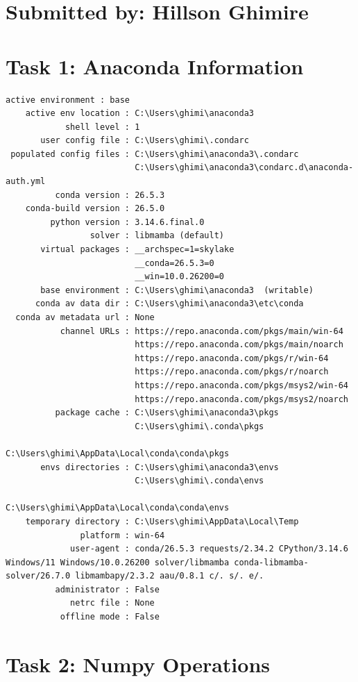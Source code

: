 \documentclass[11pt,a4paper]{article}
\begin{document}
\section*{Submitted by: Hillson Ghimire}
\section*{Task 1: Anaconda Information}

\begin{lstlisting}[style=commandprompt, title={\textbf{Command Prompt: \texttt{conda info}}}]
     active environment : base
    active env location : C:\Users\ghimi\anaconda3
            shell level : 1
       user config file : C:\Users\ghimi\.condarc
 populated config files : C:\Users\ghimi\anaconda3\.condarc
                          C:\Users\ghimi\anaconda3\condarc.d\anaconda-auth.yml
          conda version : 26.5.3
    conda-build version : 26.5.0
         python version : 3.14.6.final.0
                 solver : libmamba (default)
       virtual packages : __archspec=1=skylake
                          __conda=26.5.3=0
                          __win=10.0.26200=0
       base environment : C:\Users\ghimi\anaconda3  (writable)
      conda av data dir : C:\Users\ghimi\anaconda3\etc\conda
  conda av metadata url : None
           channel URLs : https://repo.anaconda.com/pkgs/main/win-64
                          https://repo.anaconda.com/pkgs/main/noarch
                          https://repo.anaconda.com/pkgs/r/win-64
                          https://repo.anaconda.com/pkgs/r/noarch
                          https://repo.anaconda.com/pkgs/msys2/win-64
                          https://repo.anaconda.com/pkgs/msys2/noarch
          package cache : C:\Users\ghimi\anaconda3\pkgs
                          C:\Users\ghimi\.conda\pkgs
                          C:\Users\ghimi\AppData\Local\conda\conda\pkgs
       envs directories : C:\Users\ghimi\anaconda3\envs
                          C:\Users\ghimi\.conda\envs
                          C:\Users\ghimi\AppData\Local\conda\conda\envs
    temporary directory : C:\Users\ghimi\AppData\Local\Temp
               platform : win-64
             user-agent : conda/26.5.3 requests/2.34.2 CPython/3.14.6 Windows/11 Windows/10.0.26200 solver/libmamba conda-libmamba-solver/26.7.0 libmambapy/2.3.2 aau/0.8.1 c/. s/. e/.
          administrator : False
             netrc file : None
           offline mode : False
\end{lstlisting}

\section*{Task 2: Numpy Operations}







\end{document}
